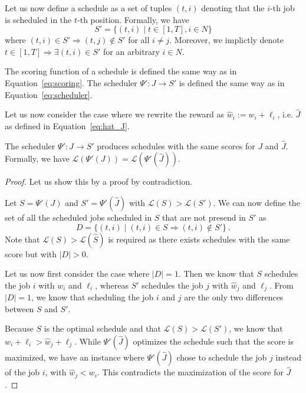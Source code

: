 Let us now define a schedule as a set of tuples $(t, i)$ denoting that the $i$-th job is scheduled in the $t$-th position.
Formally, we have
\begin{equation}
    S' = \{(t, i) \mid t\in [1, T], i\in N\}
\end{equation}
where $(t, i)\in S' \Rightarrow (t, j)\notin S'$ for all $i\neq j$. Moreover, we implictly denote $t\in [1, T] \Rightarrow \exists (t, i)\in S'$ for an arbitrary $i\in N$.

The scoring function of a schedule is defined the same way as in Equation~\ref{eq:scoring}. The scheduler $\Psi' : J \rightarrow S'$ is defined the same way as in Equation~\ref{eq:scheduler}.

Let us now consider the case where we rewrite the reward as $\hat{w}_i := w_i + \ell_i$, i.e. $\hat{J}$ as defined in Equation~\ref{eq:hat_J}.

\begin{theorem}
    The scheduler $\Psi' : J \rightarrow S'$ produces schedules with the same scores for $J$ and $\hat{J}$. Formally, we have $\mathcal{L}(\Psi'(J)) = \mathcal{L}(\Psi'(\hat{J}))$.
\end{theorem}

\begin{proof}

    Let us show this by a proof by contradiction. 

    Let $S = \Psi'(J)$ and ${S}' = \Psi'(\hat{J})$ with $\mathcal{L}(S) > \mathcal{L}({S}')$. 
    We can now define the set of all the scheduled jobs scheduled in $S$ that are not presend in ${S}'$ as 
    \begin{equation*}
        D = \{(t, i) \mid (t, i)\in S \Rightarrow (t, i)\notin {S}'\} \ .
    \end{equation*}
    Note that $\mathcal{L}(S) > \mathcal{L}(\hat{S})$ is required as there exists schedules with the same score but with $|D| > 0$. 

    Let us now first consider the case where $|D| = 1$.
    Then we know that $S$ schedules the job $i$ with $w_i$ and $\ell_i$, whereas ${S}'$ schedules the job $j$ with $\hat{w}_j$ and $\ell_j$.
    From $|D|=1$, we know that scheduling the job $i$ and $j$ are the only two differences between $S$ and ${S}'$.

    Because $S$ is the optimal schedule and that $\mathcal{L}(S) > \mathcal{L}({S}')$, we know that $w_i + \ell_i > \hat{w}_j + \ell_j$. 
    While $\Psi'(\hat{J})$ optimizes the schedule such that the score is maximized, we have an instance where $\Psi'(\hat{J})$ chose to schedule the job $j$ instead of the job $i$, with $\hat{w}_j < w_i$.
    This contradicts the maximization of the score for $\hat{J}$.
    
\end{proof}

